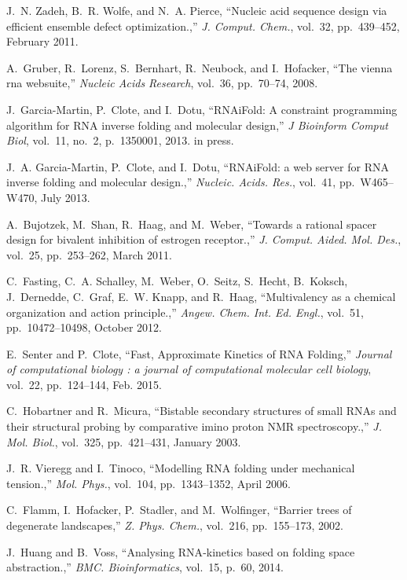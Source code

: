 \documentclass[11pt, oneside]{Thesis} %
\begin{document}
\begin{thebibliography}{100}
J.~N. Zadeh, B.~R. Wolfe, and N.~A. Pierce, ``Nucleic acid sequence design via
  efficient ensemble defect optimization.,'' {\em J. Comput. Chem.}, vol.~32,
  pp.~439--452, February 2011.

A.~Gruber, R.~Lorenz, S.~Bernhart, R.~Neubock, and I.~Hofacker, ``The vienna
  rna websuite,'' {\em Nucleic Acids Research}, vol.~36, pp.~70--74, 2008.

J.~Garcia-Martin, P.~Clote, and I.~Dotu, ``{RNAiFold}: A constraint programming
  algorithm for {RNA} inverse folding and molecular design,'' {\em J Bioinform
  Comput Biol}, vol.~11, no.~2, p.~1350001, 2013.
\newblock in press.

J.~A. Garcia-Martin, P.~Clote, and I.~Dotu, ``{RNAiFold}: a web server for
  {RNA} inverse folding and molecular design.,'' {\em Nucleic. Acids. Res.},
  vol.~41, pp.~W465--W470, July 2013.

A.~Bujotzek, M.~Shan, R.~Haag, and M.~Weber, ``Towards a rational spacer design
  for bivalent inhibition of estrogen receptor.,'' {\em J. Comput. Aided. Mol.
  Des.}, vol.~25, pp.~253--262, March 2011.

C.~Fasting, C.~A. Schalley, M.~Weber, O.~Seitz, S.~Hecht, B.~Koksch,
  J.~Dernedde, C.~Graf, E.~W. Knapp, and R.~Haag, ``Multivalency as a chemical
  organization and action principle.,'' {\em Angew. Chem. Int. Ed. Engl.},
  vol.~51, pp.~10472--10498, October 2012.

E.~Senter and P.~Clote, ``{Fast, Approximate Kinetics of RNA Folding},'' {\em
  Journal of computational biology : a journal of computational molecular cell
  biology}, vol.~22, pp.~124--144, Feb. 2015.

C.~Hobartner and R.~Micura, ``Bistable secondary structures of small {RNAs} and
  their structural probing by comparative imino proton {NMR} spectroscopy.,''
  {\em J. Mol. Biol.}, vol.~325, pp.~421--431, January 2003.

J.~R. Vieregg and I.~Tinoco, ``Modelling {RNA} folding under mechanical
  tension.,'' {\em Mol. Phys.}, vol.~104, pp.~1343--1352, April 2006.

C.~Flamm, I.~Hofacker, P.~Stadler, and M.~Wolfinger, ``Barrier trees of
  degenerate landscapes,'' {\em Z. Phys. Chem.}, vol.~216, pp.~155--173, 2002.

J.~Huang and B.~Voss, ``Analysing {RNA}-kinetics based on folding space
  abstraction.,'' {\em BMC. Bioinformatics}, vol.~15, p.~60, 2014.


\end{thebibliography}
\end{document}
